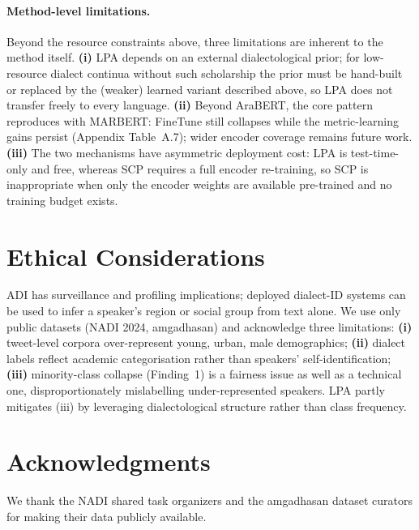 \documentclass[11pt]{article}
\begin{document}
\paragraph{Method-level limitations.}
Beyond the resource constraints above, three limitations are
inherent to the method itself. \textbf{(i)} LPA depends on an
external dialectological prior; for low-resource dialect
continua without such scholarship the prior must be hand-built
or replaced by the (weaker) learned variant described above,
so LPA does not transfer freely to every
language.  \textbf{(ii)} Beyond AraBERT, the core pattern reproduces with
 MARBERT: FineTune still collapses while the metric-learning gains
 persist (Appendix Table~A.7); wider encoder coverage remains
 future work. \textbf{(iii)} The two mechanisms have
asymmetric deployment cost: LPA is test-time-only and free,
whereas SCP requires a full encoder re-training, so SCP is
inappropriate when only the encoder weights are available
pre-trained and no training budget exists.

\section{Ethical Considerations}
ADI has surveillance and profiling implications; deployed
dialect-ID systems can be used to infer a speaker's region or
social group from text alone. We use only public datasets
(NADI 2024, amgadhasan) and acknowledge three limitations:
\textbf{(i)} tweet-level corpora over-represent young,
urban, male demographics; \textbf{(ii)} dialect labels
reflect academic categorisation rather than speakers'
self-identification; \textbf{(iii)} minority-class collapse
(Finding~1) is a fairness issue as well as a technical one,
disproportionately mislabelling under-represented speakers.
LPA partly mitigates (iii) by leveraging dialectological
structure rather than class frequency.

\section*{Acknowledgments}
We thank the NADI shared task organizers and the amgadhasan
dataset curators for making their data publicly available.


\end{document}
